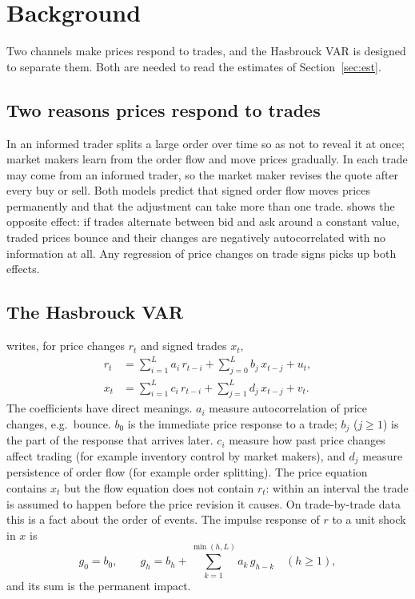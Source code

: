 \documentclass[11pt,a4paper]{article}
\begin{document}
\section{Background}
\label{sec:background}

Two channels make prices respond to trades, and the Hasbrouck VAR is designed to separate them. Both are needed to read the estimates of Section~\ref{sec:est}.


\subsection{Two reasons prices respond to trades}

In \citet{kyle1985} an informed trader splits a large order over time so as not to reveal it at once;
market makers learn from the order flow and move prices gradually. In \citet{glosten1985} each trade
may come from an informed trader, so the market maker revises the quote after every buy or sell. Both
models predict that signed order flow moves prices permanently and that the adjustment can take more
than one trade. \citet{roll1984} shows the opposite effect: if trades alternate between bid and ask
around a constant value, traded prices bounce and their changes are negatively autocorrelated with no
information at all. Any regression of price changes on trade signs picks up both effects.

\subsection{The Hasbrouck VAR}

\citet{hasbrouck1991} writes, for price changes $r_t$ and signed trades $x_t$,
\begin{align}
r_t &= \sum_{i=1}^{L} a_i\, r_{t-i} + \sum_{j=0}^{L} b_j\, x_{t-j} + u_t, \label{eq:price}\\
x_t &= \sum_{i=1}^{L} c_i\, r_{t-i} + \sum_{j=1}^{L} d_j\, x_{t-j} + v_t. \label{eq:flow}
\end{align}
The coefficients have direct meanings. $a_i$ measure autocorrelation of price changes, e.g.\ bounce.
$b_0$ is the immediate price response to a trade; $b_j$ ($j\ge1$) is the part of the response that
arrives later. $c_i$ measure how past price changes affect trading (for example inventory control by
market makers), and $d_j$ measure persistence of order flow (for example order splitting). The price
equation contains $x_t$ but the flow equation does not contain $r_t$: within an interval the trade is
assumed to happen before the price revision it causes. On trade-by-trade data this is a fact about the
order of events. The impulse response of $r$ to a unit shock in $x$ is
\begin{equation}
g_0 = b_0,\qquad g_h = b_h + \sum_{k=1}^{\min(h,L)} a_k\, g_{h-k}\quad(h\ge1),
\label{eq:irf}
\end{equation}
and its sum is the permanent impact.
\end{document}
